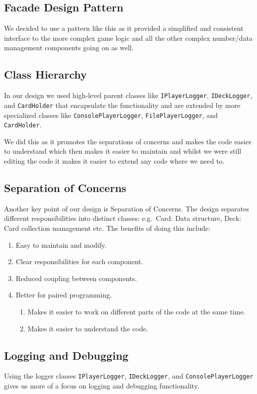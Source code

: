 \documentclass{article}
\begin{document}
    \subsection{Facade Design Pattern}
    We decided to use a pattern like this as it provided a simplified and consistent interface to the more complex game logic and all the other complex number/data management components going on as well.

    \subsection{Class Hierarchy}
    In our design we used high-level parent classes like \texttt{IPlayerLogger}, \texttt{IDeckLogger}, and \texttt{CardHolder} that encapsulate the functionality and are extended by more specialized classes like \texttt{ConsolePlayerLogger}, \texttt{FilePlayerLogger}, and \texttt{CardHolder}.

    We did this as it promotes the separations of concerns and makes the code easier to understand which then makes it easier to maintain and whilst we were still editing the code it makes it easier to extend any code where we need to.

    \subsection{Separation of Concerns}
    Another key point of our design is Separation of Concerns.
    The design separates different responsibilities into distinct classes: e.g.\ Card: Data structure, Deck: Card collection management etc.
    The benefits of doing this include:
    \begin{enumerate}
        \item Easy to maintain and modify.
        \item Clear responsibilities for each component.
        \item Reduced coupling between components.
        \item Better for paired programming.
        \begin{enumerate}
            \item Makes it easier to work on different parts of the code at the same time.
            \item Makes it easier to understand the code.
        \end{enumerate}
    \end{enumerate}

    \subsection{Logging and Debugging}
    Using the logger classes \texttt{IPlayerLogger}, \texttt{IDeckLogger}, and \texttt{ConsolePlayerLogger} gives us more of a focus on logging and debugging functionality.
\end{document}
